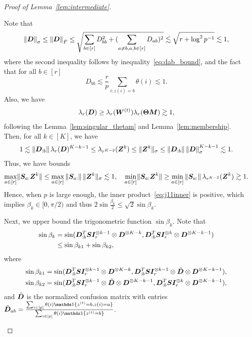 \documentclass[lettersize,onecolumn,journal]{IEEEtran}
\theoremstyle{definition}
\theoremstyle{definition}
\begin{document}
\begin{proof}[Proof of Lemma~\ref{lem:intermediate}]
\begin{enumerate}
    Note that 
    \begin{equation}\label{eq:singular_Du}
        \onorm{\mD}_{\sigma} \leq \onorm{\mD}_{F} \leq  \sqrt{\sum_{b \in [r]} D_{bb}^2 + (\sum_{a \neq b, a ,b \in [r]} D_{ab} )^2} \lesssim \sqrt{r  + \log^2 p^{-1}} \lesssim 1,
    \end{equation}
    where the second inequality follows by inequality~\eqref{eq:dab_bound}, and the fact that for all $b \in [r]$ 
    \begin{equation}
        D_{bb} \lesssim \frac{r}{p} \sum_{i\colon z(i) = b} \theta(i) \lesssim 1.
    \end{equation}
    Also, we have 
    \begin{equation}\label{eq:singular_Dl}
        \lambda_r(\mD) \geq \lambda_r(\mW^{(t)}) \lambda_r(\mTheta \mM) \gtrsim 1,
    \end{equation}
    following the Lemma~\ref{lem:singular_thetam} and Lemma~\ref{lem:membership}. Then, for all $k \in [K]$, we have 
    \begin{equation}\label{eq:singular_z}
       1 \lesssim \onorm{\mD_{:b}} \lambda_r(\mD)^{K-k-1}  \leq \lambda_{r^{K-2}}(\mZ^{k}) \leq \onormSize{}{\mZ^k}_{\sigma} \leq \onorm{\mD_{:b}} \onorm{\mD}_{\sigma}^{K-k-1} \lesssim 1.
    \end{equation}
    Thus, we have bounds 
    \begin{equation}
         \max_{a \in [r]} \lVert\bm S_{a:} \bm Z^k\rVert \leq \max_{a \in [r]} \left\lVert\bm S_{a:}\right\rVert \lVert\bm Z^k\rVert_{\sigma} \lesssim 1, \quad \min_{a \in [r]} \lVert\bm S_{a:}\bm Z^k\rVert  \geq \min_{a \in [r]} \left\lVert\bm S_{a:}\right\rVert \lambda_{r^{K-2}}(\bm Z^{k}) \gtrsim 1.
    \end{equation}
    Hence, when $p$ is large enough, the inner product~\eqref{eq:j11inner} is positive, which implies $\beta_k \in [0, \pi/2)$ and thus $2 \sin \frac{\beta_k}{2} \leq \sqrt{2} \sin \beta_k$.
    
    Next, we upper bound the trigonometric function $\sin \beta_k$. Note that
    \begin{align}
         \sin \beta_k &= \sin ({\bm{D}_{:b}^{T} \bm S \bm I_r^{\otimes k-1} \otimes \bm{D}^{\otimes K-k} }, {\bm{D}_{:b}^{T} \bm S \bm I_r^{\otimes k} \otimes \bm{D}^{\otimes K-k-1} } )\\
         &\leq \sin \beta_{k1} + \sin \beta_{k2},
    \end{align}
    where
    \begin{align}
         \sin \beta_{k1} &= \sin ({\bm{D}_{:b}^{T} \bm S \bm I_r^{\otimes k-1} \otimes \bm{D}^{\otimes K-k} }, {\bm{D}_{:b}^{T} \bm S \bm I_r^{\otimes k-1} \otimes \tilde {\bm{D}} \otimes \bm{D}^{\otimes K-k-1} } ),\\
         \sin \beta_{k2} & = \sin ({\bm{D}_{:b}^{T} \bm S \bm I_r^{\otimes k-1} \otimes \tilde {\bm{D}} \otimes \bm{D}^{\otimes K-k-1} } , {\bm{D}_{:b}^{T} \bm S \bm I_r^{\otimes k} \otimes \bm{D}^{\otimes K-k-1} }   ),
    \end{align}
    and $\tilde {\bm{D}}$ is the normalized confusion matrix with entries $\tilde \mD_{ab} = \frac{\sum_{i \in [p]} \theta(i) \ind\{z^{(t)} = b, z(i) = a\}}{\sum_{i \in [p] }\theta(i) \ind\{z^{(t)} = b\}}$.
    

\end{enumerate}
\end{proof}
\end{document}

